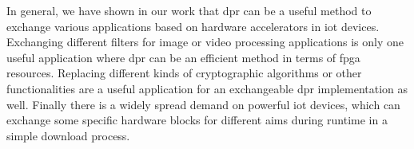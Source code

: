 In general, we have shown in our work that \gls{dpr} can be a useful method to
exchange various applications based on hardware accelerators in \gls{iot}
devices.
Exchanging different filters for image or video processing applications is only
one useful application where \gls{dpr} can be an efficient method in terms of
\gls{fpga} resources.
Replacing different kinds of cryptographic algorithms or other functionalities
are a useful application for an exchangeable \gls{dpr} implementation as well.
Finally there is a widely spread demand on powerful \gls{iot} devices, which
can exchange some specific hardware blocks for different aims during
runtime in a simple download process.
